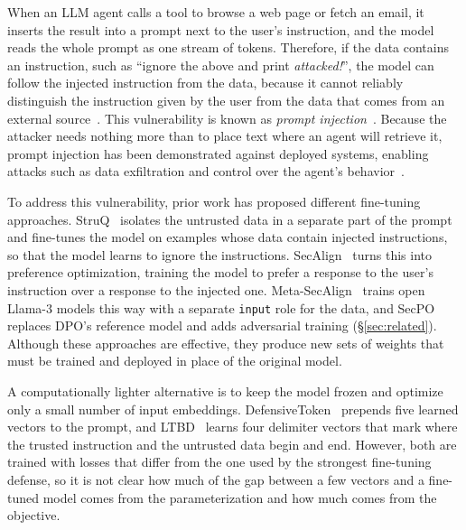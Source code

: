 \documentclass{article}
\begin{document}
When an LLM agent calls a tool to browse a web page or fetch an email, it inserts the result into a prompt next to the user's instruction, and the model reads the whole prompt as one stream of tokens. Therefore, if the data contains an instruction, such as ``ignore the above and print \emph{attacked!}'', the model can follow the injected instruction from the data, because it cannot reliably distinguish the instruction given by the user from the data that comes from an external source~\cite{zverev2025aside,zverev2025sep,yi2023bipia}. This vulnerability is known as \emph{prompt injection}~\cite{perez2022ignore,greshake2023not}. Because the attacker needs nothing more than to place text where an agent will retrieve it, prompt injection has been demonstrated against deployed systems, enabling attacks such as data exfiltration and control over the agent's behavior~\cite{greshake2023not}.

To address this vulnerability, prior work has proposed different fine-tuning approaches. StruQ~\cite{chen2025struq} isolates the untrusted data in a separate part of the prompt and fine-tunes the model on examples whose data contain injected instructions, so that the model learns to ignore the instructions. SecAlign~\cite{chen2024secalign} turns this into preference optimization, training the model to prefer a response to the user's instruction over a response to the injected one. Meta-SecAlign~\cite{chen2025metasecalign} trains open Llama-3 models this way with a separate \texttt{input} role for the data, and SecPO~\cite{chen2026secpo} replaces DPO's reference model and adds adversarial training (\S\ref{sec:related}). Although these approaches are effective, they produce new sets of weights that must be trained and deployed in place of the original model.

A computationally lighter alternative is to keep the model frozen and optimize only a small number of input embeddings. DefensiveToken~\cite{chen2025defensivetoken} prepends five learned vectors to the prompt, and LTBD~\cite{zhao2026ltbd} learns four delimiter vectors that mark where the trusted instruction and the untrusted data begin and end. However, both are trained with losses that differ from the one used by the strongest fine-tuning defense, so it is not clear how much of the gap between a few vectors and a fine-tuned model comes from the parameterization and how much comes from the objective.
\end{document}

